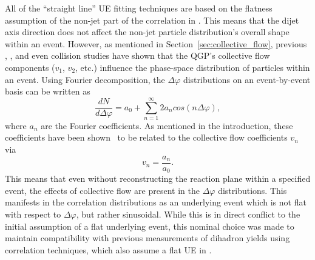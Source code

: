 All of the ``straight line'' UE fitting techniques are based on the flatness assumption of the non-jet part of the correlation in \dphi. This means that the dijet axis direction does not affect the non-jet particle distribution's overall shape within an event. However, as mentioned in Section~\ref{sec:collective_flow}, previous \PbPb, \pPb, and even \pp collision studies have shown that the QGP's collective flow components ($v_{1}$, $v_{2}$, etc.) influence the phase-space distribution of particles within an event. Using Fourier decomposition, the $\Delta\varphi$ distributions on an event-by-event basis can be written as
%
\begin{equation}
    \label{eq:dphi_fourier_decomposition}
    \frac{dN}{d\Delta\varphi} = a_{0} + \sum_{n=1}^{\infty}2a_{n}cos(n\Delta\varphi),
\end{equation}
%
where $a_{n}$ are the Fourier coefficients. As mentioned in the introduction, these coefficients have been shown~\cite{FlowDphi} to be related to the collective flow coefficients $v_{n}$ via
%
\begin{equation}
    \label{eq:fourier_vn_relation}
    v_{n} = \frac{a_{n}}{a_{0}}.
\end{equation}
%
This means that even without reconstructing the reaction plane within a specified event, the effects of collective flow are present in the $\Delta\varphi$ distributions. This manifests in the correlation distributions as an underlying event which is not flat with respect to $\Delta\varphi$, but rather sinusoidal. While this is in direct conflict to the initial assumption of a flat underlying event, this nominal choice was made to maintain compatibility with previous measurements of dihadron yields using correlation techniques, which also assume a flat UE in \dphi.

